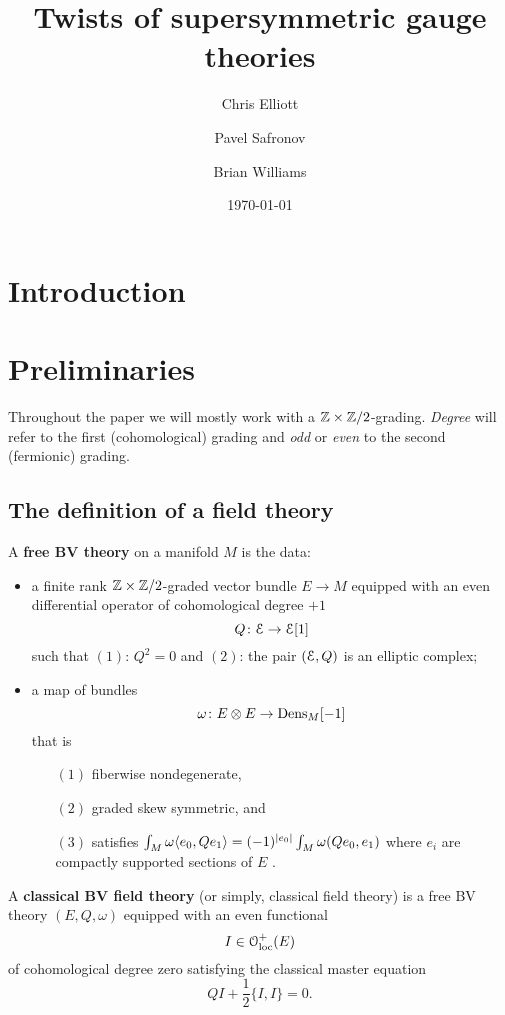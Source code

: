 \documentclass[10pt, oneside]{article}
\title{Twists of supersymmetric gauge theories}
\author{Chris Elliott\and Pavel Safronov \and Brian Williams}
\date{\today}
\begin{document}
\maketitle

\section*{Introduction}

\section{Preliminaries}

Throughout the paper we will mostly work with a $\mathbb Z\times\mathbb Z/2$-grading. \emph{Degree} will refer to the first (cohomological) grading and \emph{odd} or \emph{even} to the second (fermionic) grading.

\subsection{The definition of a field theory}

\begin{dfn}
A {\bf free BV theory} on a manifold $M$ is the data:
\begin{itemize}
\item a finite rank $\mathbb Z\times\mathbb Z/2$-graded vector bundle $E \to M$ equipped with an even differential operator of cohomological degree $+1$
\[
Q \colon \mathcal E \to \mathcal E [1] 
\]
such that $(1)$: $Q^2 = 0$ and $(2)$: the pair $(\mathcal E , Q)$ is an elliptic complex;
\item a map of bundles
\[
\omega\colon E \otimes E \to {\rm Dens}_M [-1]
\]
that is
\begin{enumerate}
\item[$(1)$] fiberwise nondegenerate,
\item[$(2)$] graded skew symmetric, and
\item[$(3)$] satisfies $\int_M \omega\langle e_0, Q e_1\rangle = (-1)^{|e_0|} \int_M \omega(Q e_0, e_1)$ where $e_i$ are compactly supported sections of $E$ .
\end{enumerate}
\end{itemize}
\end{dfn}


\begin{dfn}
A {\bf classical BV field theory} (or simply, classical field theory) is a free BV theory $(E, Q, \omega)$ equipped with an even functional
\[
I \in \mathcal{O}_{\rm loc}^+(E)
\]
of cohomological degree zero satisfying the classical master equation 
\[
Q I + \frac{1}{2} \{I,I\} = 0 .
\]
\end{dfn}
\end{document}
